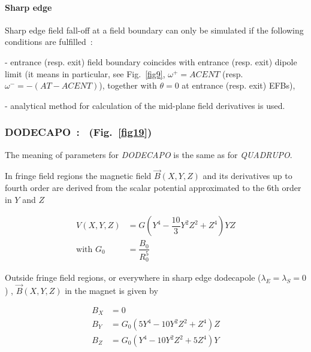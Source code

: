 \bigskip

\paragraph{Sharp edge} 

\noindent Sharp edge field fall-off at a field boundary  can only be simulated if the following conditions are fulfilled~: 

- entrance (resp. exit)  field boundary  coincides with entrance (resp. exit) 
dipole limit (it means in particular, see Fig.~\ref{fig9},  
$\omega^+= ACENT$ (resp. $\omega^- = -(AT-ACENT)$), 
together with $\theta=0$ at entrance (resp. exit) EFBs), 

- analytical method for calculation of the  mid-plane field derivatives is used. 








\newpage

\subsubsection*{DODECAPO~: \DODECAPOTitl\  (Fig.\protect~\ref{fig19})} \label{DODECAPO}  
\medskip


 The meaning of parameters for \textsl{DODECAPO}  is the same as for \textsl{QUADRUPO}. 

\noindent In fringe field regions the magnetic field $ \vec  B(X,Y,Z) $ and
its derivatives up to fourth order are derived from the scalar potential approximated to 
the 6th order in $ Y $ and $ Z $ 

\begin{align*}
	V(X,Y,Z) &   = G \left(Y^4- \dfrac{10 }{ 3} Y^2Z^2+Z^4 \right) YZ  \\
	\text{with } G_0 &   =  \dfrac{ B_0 }{ R^5_0} 
\end{align*}

\noindent Outside fringe field regions, or everywhere in sharp edge dodecapole
($ \lambda_ E=\lambda_ S=0$) , $ \vec  B(X,Y,Z) $ in the magnet is given by 

\begin{align*}
	B_X &   =   0 \\
	B_Y &   =    G_0(5Y^4-10Y^2Z^2+Z^4)Z \\
	B_Z &   = G_0(Y^4-10Y^2Z^2+5Z^4)Y  
\end{align*}
\vfill

